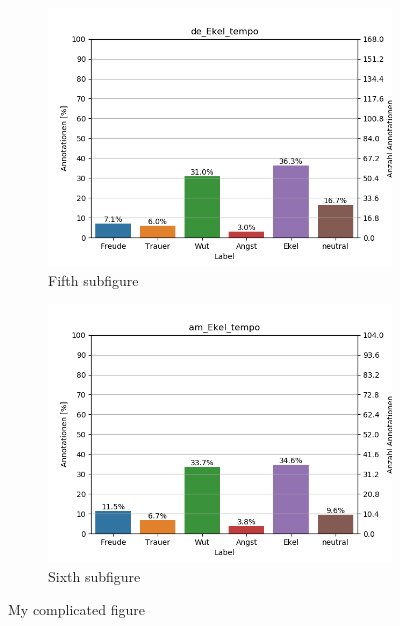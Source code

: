 \documentclass[11pt,a4paper,headsepline,twoside,toc=bibliography]{scrreprt}
\begin{document}
\begin{figure}[t!]
	\medskip
	\begin{subfigure}{0.48\textwidth}
		\includegraphics[width=\linewidth]{plots/de_Ekel_tempo.png}
		\caption{Fifth subfigure} \label{fig:de_E_tempo}
	\end{subfigure}\hspace*{\fill}
	\begin{subfigure}{0.48\textwidth}
		\includegraphics[width=\linewidth]{plots/am_Ekel_tempo.png}
		\caption{Sixth subfigure} \label{fig:am_E_tempo}
	\end{subfigure}
	
	\caption{My complicated figure} \label{fig:countplots_E}
\end{figure}
\end{document}
